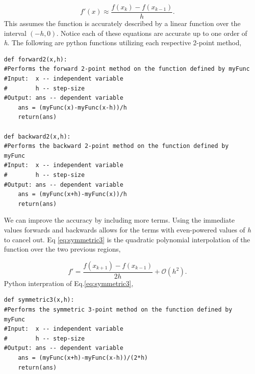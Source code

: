 \documentclass[10pt]{article}
\begin{document}
\begin{equation}
\label{eq:backward2}
	f'(x) \approx \frac{f(x_k)-f(x_{k-1})}{h}.
\end{equation}
This assumes the function is accurately described by a linear function over the interval $(-h,0)$. Notice each of these equations are accurate up to one order of \textit{h}. The following are python functions utilizing each respective 2-point method,
\begin{lstlisting}
def forward2(x,h):
#Performs the forward 2-point method on the function defined by myFunc
#Input:  x -- independent variable
#        h -- step-size
#Output: ans -- dependent variable
    ans = (myFunc(x)-myFunc(x-h))/h
    return(ans)

def backward2(x,h):
#Performs the backward 2-point method on the function defined by myFunc
#Input:  x -- independent variable
#        h -- step-size
#Output: ans -- dependent variable
    ans = (myFunc(x+h)-myFunc(x))/h
    return(ans)
\end{lstlisting}
    
We can improve the accuracy by including more terms. Using the immediate values forwards and backwards allows for the terms with even-powered values of \textit{h} to cancel out. Eq \ref{eq:symmetric3} is the quadratic polynomial interpolation of the function over the two previous regions,

\begin{equation}
\label{eq:symmetric3}
	f'=\frac{f(x_{k+1})-f(x_{k-1})}{2h} + \mathcal{O}(h^2).
\end{equation} 
Python interpration of Eq.\ref{eq:symmetric3},
\begin{lstlisting}
def symmetric3(x,h):
#Performs the symmetric 3-point method on the function defined by myFunc
#Input:  x -- independent variable
#        h -- step-size
#Output: ans -- dependent variable
    ans = (myFunc(x+h)-myFunc(x-h))/(2*h)
    return(ans)
\end{lstlisting}
\end{document}
